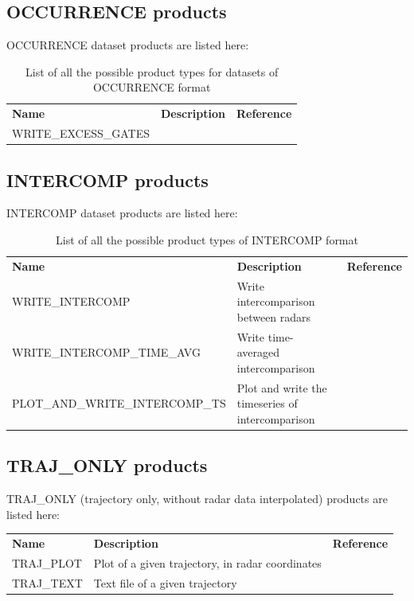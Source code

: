 \documentclass[a4paper,11pt,pdftex,twoside]{scrartcl}
\renewcommand{\bf}{\normalfont \bfseries}
\begin{document}
{{{\subsection{OCCURRENCE products}
OCCURRENCE dataset products are listed here:

\begin{table}[H]
\begin{tabularx}{\textwidth}{lXl}
{\bf Name} & {\bf Description} & {\bf Reference}\\
 WRITE\_EXCESS\_GATES &  &  \\
\end{tabularx}
\caption{List of all the possible product types for datasets of OCCURRENCE format}
\label{tab_products_OCCURRENCE}
\end{table}

\subsection{INTERCOMP products}
INTERCOMP dataset products are listed here:

\begin{table}[H]
\begin{tabularx}{\textwidth}{lXl}
{\bf Name} & {\bf Description} & {\bf Reference}\\
 WRITE\_INTERCOMP & Write intercomparison between radars &  \\
 WRITE\_INTERCOMP\_TIME\_AVG & Write time-averaged intercomparison  &  \\
 PLOT\_AND\_WRITE\_INTERCOMP\_TS & Plot and write the timeseries of intercomparison & \\

\end{tabularx}
\caption{List of all the possible product types of INTERCOMP format}
\label{tab_products_INTERCOMP}
\end{table}

\subsection{TRAJ\_ONLY products}
TRAJ\_ONLY (trajectory only, without radar data interpolated) products are listed here:

\begin{table}[H]
\begin{tabularx}{\textwidth}{lXl}
{\bf Name} & {\bf Description} & {\bf Reference}\\
 TRAJ\_PLOT & Plot of a given trajectory, in radar coordinates &  \\
 TRAJ\_TEXT & Text file of  a given trajectory &  \\



\end{tabularx}
\end{table}}}}
\end{document}
